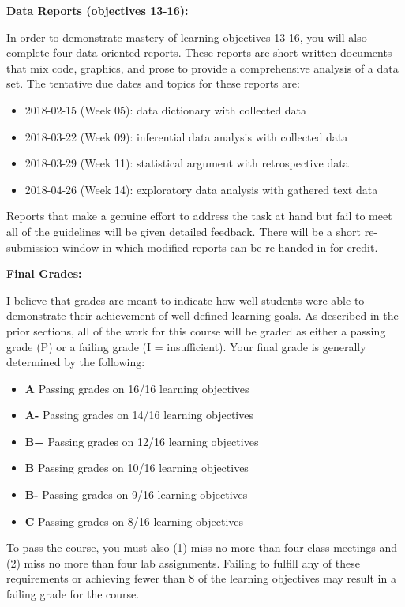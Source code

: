 \documentclass[12pt]{article}
\begin{document}
\bigskip

\textbf{Data Reports (objectives 13-16):} \vspace{6pt}

In order to demonstrate mastery of learning objectives 13-16,
you will also complete four data-oriented reports. These reports
are short written documents that mix code, graphics, and prose to
provide a comprehensive analysis of a data set. The tentative due
dates and topics for these reports are:
\begin{itemize}\setlength\itemsep{0em}
\item 2018-02-15 (Week 05): data dictionary with collected data
\item 2018-03-22 (Week 09): inferential data analysis with collected data
\item 2018-03-29 (Week 11): statistical argument with retrospective data
\item 2018-04-26 (Week 14): exploratory data analysis with gathered text data
\end{itemize}
Reports that make a genuine effort to address the task at hand but
fail to meet all of the guidelines will be given detailed feedback.
There will be a short re-submission window in which modified reports
can be re-handed in for credit.

\bigskip

\textbf{Final Grades:} \vspace{6pt}

I believe that grades are meant to indicate how well students
were able to demonstrate their achievement of well-defined
learning goals. As described in the prior sections, all of the
work for this course will be graded as either a passing grade (P)
or a failing grade (I = insufficient). Your final grade is
generally determined by the following:
\begin{itemize}\setlength\itemsep{0em}
\item \textbf{A} \quad Passing grades on 16/16 learning objectives
\item \textbf{A-} \quad Passing grades on 14/16 learning objectives
\item \textbf{B+} \quad Passing grades on 12/16 learning objectives
\item \textbf{B} \quad Passing grades on 10/16 learning objectives
\item \textbf{B-} \quad Passing grades on 9/16 learning objectives
\item \textbf{C} \quad Passing grades on 8/16 learning objectives
\end{itemize}
To pass the course, you must also (1) miss no more than four class
meetings and (2) miss no more than four lab assignments. Failing to
fulfill any of these requirements or achieving fewer than 8 of the
learning objectives may result in a failing grade for the course.
\end{document}
